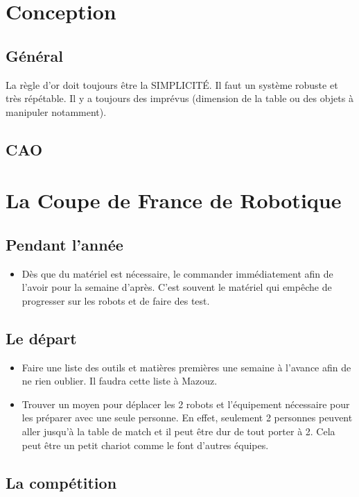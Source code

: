 \documentclass[a4paper, 11pt]{report}
\begin{document}
\part{Conception}

\chapter{Général}

La règle d'or doit toujours être la SIMPLICITÉ. Il faut un système robuste et très répétable. Il y a toujours des imprévus (dimension de la table ou des objets à manipuler notamment).

\chapter{CAO}

\part{La Coupe de France de Robotique}

\chapter{Pendant l'année}
\begin{itemize}
\item Dès que du matériel est nécessaire, le commander immédiatement afin de l’avoir pour la semaine d’après. C’est souvent le matériel qui empêche de progresser sur les robots et de faire des test.
\end{itemize}
\chapter{Le départ}
\begin{itemize}
\item Faire une liste des outils et matières premières une semaine à l’avance afin de ne rien oublier. Il faudra cette liste à Mazouz.
\item Trouver un moyen pour déplacer les 2 robots et l’équipement nécessaire pour les préparer avec une seule personne. En effet, seulement 2 personnes peuvent aller jusqu’à la table de match et il peut être dur de tout porter à 2. Cela peut être un petit chariot comme le font d’autres équipes.
\end{itemize}

\chapter{La compétition}
\end{document}
